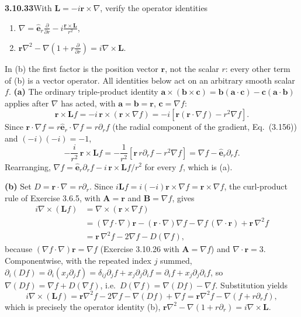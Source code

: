 \par\bigskip
\noindent\textbf{3.10.33}\quad With $\mathbf{L}=-i\mathbf{r}\times\nabla$,
verify the operator identities
\begin{enumerate}
\item[(a)] $\displaystyle\nabla=\hat{\mathbf{e}}_{r}\frac{\partial}{\partial r}
  -i\frac{\mathbf{r}\times\mathbf{L}}{r^{2}}$,
\item[(b)] $\displaystyle \mathbf{r}\nabla^{2}-\nabla\left(1+r\frac{\partial}
  {\partial r}\right)=i\nabla\times\mathbf{L}$.
\end{enumerate}
\solution
In (b) the first factor is the position vector $\mathbf r$, not the
scalar $r$: every other term of (b) is a vector operator.
All identities below act on an arbitrary smooth scalar $f$.
\textbf{(a)} The ordinary triple-product identity
$\mathbf a\times(\mathbf b\times\mathbf c)
=\mathbf b(\mathbf a\cdot\mathbf c)-\mathbf c(\mathbf a\cdot\mathbf b)$
applies after $\nabla$ has acted, with
$\mathbf a=\mathbf b=\mathbf r$, $\mathbf c=\nabla f$:
\[
\mathbf r\times\mathbf L f
=-i\,\mathbf r\times(\mathbf r\times\nabla f)
=-i[\mathbf r(\mathbf r\cdot\nabla f)-r^2\nabla f].
\]
Since $\mathbf r\cdot\nabla f=r\hat{\mathbf e}_r\cdot\nabla f=r\partial_r f$
(the radial component of the gradient, Eq.~(3.156)) and $(-i)(-i)=-1$,
\[
-\frac{i}{r^2}\,\mathbf r\times\mathbf L f
=-\frac1{r^2}[\mathbf r\,r\partial_rf-r^2\nabla f]
=\nabla f-\hat{\mathbf e}_r\partial_r f.
\]
Rearranging, $\nabla f=\hat{\mathbf e}_r\partial_rf-i\,\mathbf r\times\mathbf Lf/r^2$
for every $f$, which is (a).

\textbf{(b)} Set $D=\mathbf r\cdot\nabla=r\partial_r$.
Since $i\mathbf Lf=i(-i)\mathbf r\times\nabla f=\mathbf r\times\nabla f$,
the curl-product rule of Exercise 3.6.5, with $\mathbf A=\mathbf r$ and
$\mathbf B=\nabla f$, gives
\[
\begin{aligned}
i\nabla\times(\mathbf Lf)
&=\nabla\times(\mathbf r\times\nabla f)\\
&=(\nabla f\cdot\nabla)\mathbf r
-(\mathbf r\cdot\nabla)\nabla f
-\nabla f\,(\nabla\cdot\mathbf r)+\mathbf r\,\nabla^2f\\
&=\mathbf r\,\nabla^2f-2\nabla f-D(\nabla f),
\end{aligned}
\]
because $(\nabla f\cdot\nabla)\mathbf r=\nabla f$ (Exercise 3.10.26 with
$\mathbf A=\nabla f$) and $\nabla\cdot\mathbf r=3$.
Componentwise, with the repeated index $j$ summed,
$\partial_i(Df)=\partial_i(x_j\partial_jf)
=\delta_{ij}\partial_jf+x_j\partial_j\partial_i f
=\partial_i f+x_j\partial_j\partial_i f$, so
$\nabla(Df)=\nabla f+D(\nabla f)$, i.e.\
$D(\nabla f)=\nabla(Df)-\nabla f$.
Substitution yields
\[
i\nabla\times(\mathbf Lf)=\mathbf r\nabla^2f-2\nabla f-\nabla(Df)+\nabla f
=\mathbf r\nabla^2f-\nabla(f+r\partial_rf),
\]
which is precisely the operator identity (b),
$\mathbf r\nabla^2-\nabla(1+r\partial_r)=i\nabla\times\mathbf L$.

